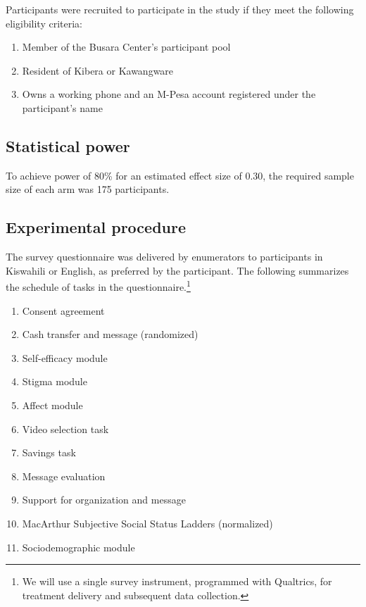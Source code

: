 \documentclass[11pt, a4paper]{article}\usepackage[]{graphicx}\usepackage[]{color}
\begin{document}
Participants were recruited to participate in the study if they meet the following eligibility criteria:

        \begin{enumerate}
        \itemsep0em 
            \item Member of the Busara Center's participant pool
            \item Resident of Kibera or Kawangware
            \item Owns a working phone and an M-Pesa account registered under the participant's name
        \end{enumerate}

    \subsection{Statistical power}

        To achieve power of 80\% for an estimated effect size of 0.30, the required sample size of each arm was 175 participants.

    \subsection{Experimental procedure}

        The survey questionnaire was delivered by enumerators to participants in Kiswahili or English, as preferred by the participant. The following summarizes the schedule of tasks in the questionnaire.\footnote{We will use a single survey instrument, programmed with Qualtrics, for treatment delivery and subsequent data collection.}

        \begin{enumerate}
        \itemsep0em 
            \item Consent agreement
            \item Cash transfer and message (randomized)
            \item Self-efficacy module
            \item Stigma module
            \item Affect module
            \item Video selection task
            \item Savings task
            \item Message evaluation
            \item Support for organization and message
            \item MacArthur Subjective Social Status Ladders (normalized)
            \item Sociodemographic module
        \end{enumerate}
\end{document}

